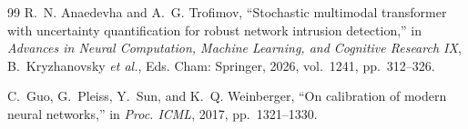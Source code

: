 \documentclass[10pt,journal,compsoc]{IEEEtran}
\begin{document}
\begin{thebibliography}{99}
R.~N. Anaedevha and A.~G. Trofimov, ``Stochastic multimodal transformer with uncertainty quantification for robust network intrusion detection,'' in \emph{Advances in Neural Computation, Machine Learning, and Cognitive Research IX}, B.~Kryzhanovsky \emph{et al.}, Eds. Cham: Springer, 2026, vol.~1241, pp.~312--326.

C.~Guo, G.~Pleiss, Y.~Sun, and K.~Q. Weinberger, ``On calibration of modern neural networks,'' in \emph{Proc. ICML}, 2017, pp.~1321--1330.

\end{thebibliography}
\end{document}
